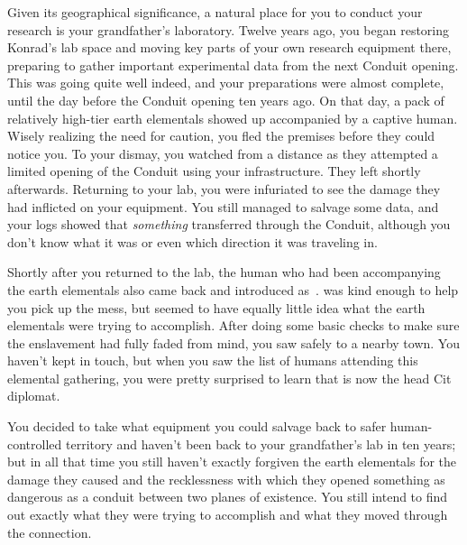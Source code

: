 \documentclass[char]{elementals}
\begin{document}


Given its geographical significance, a natural place for you to conduct your research is your grandfather's laboratory. Twelve years ago, you began restoring Konrad's lab space and moving key parts of your own research equipment there, preparing to gather important experimental data from the next Conduit opening. This was going quite well indeed, and your preparations were almost complete, until the day before the Conduit opening ten years ago. On that day, a pack of relatively high-tier earth elementals showed up accompanied by a captive human. Wisely realizing the need for caution, you fled the premises before they could notice you. To your dismay, you watched from a distance as they attempted a limited opening of the Conduit using your infrastructure. They left shortly afterwards. Returning to your lab, you were infuriated to see the damage they had inflicted on your equipment. You still managed to salvage some data, and your logs showed that \emph{something} transferred through the Conduit, although you don't know what it was or even which direction it was traveling in.

Shortly after you returned to the lab, the human who had been accompanying the earth elementals also came back and introduced \cAvatar{\themself} as~\cAvatar{\intro}. \cAvatar{\They} was kind enough to help you pick up the mess, but seemed to have equally little idea what the earth elementals were trying to accomplish. After doing some basic checks to make sure the enslavement had fully faded from \cAvatar{\their} mind, you saw \cAvatar{\them} safely to a nearby town. You haven't kept in touch, but when you saw the list of humans attending this elemental gathering, you were pretty surprised to learn that \cAvatar{} is now the head Cit diplomat.

You decided to take what equipment you could salvage back to safer human-controlled territory and haven't been back to your grandfather's lab in ten years; but in all that time you still haven't exactly forgiven the earth elementals for the damage they caused and the recklessness with which they opened something as dangerous as a conduit between two planes of existence. You still intend to find out exactly what they were trying to accomplish and what they moved through the connection.
\end{document}
